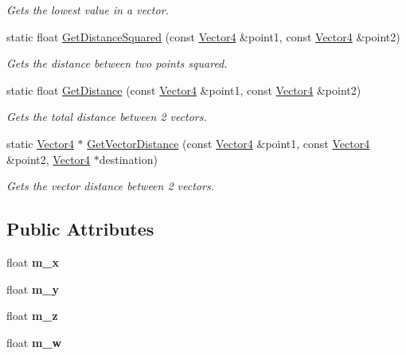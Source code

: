 \begin{DoxyCompactItemize}
\begin{DoxyCompactList}\small\item\em Gets the lowest value in a vector. \end{DoxyCompactList}\item 
static float \hyperlink{class_flounder_1_1_vector4_a02a94e3308ba3da5ff8b845d41b8131d}{Get\+Distance\+Squared} (const \hyperlink{class_flounder_1_1_vector4}{Vector4} \&point1, const \hyperlink{class_flounder_1_1_vector4}{Vector4} \&point2)
\begin{DoxyCompactList}\small\item\em Gets the distance between two points squared. \end{DoxyCompactList}\item 
static float \hyperlink{class_flounder_1_1_vector4_acf9a2b9a400177dc82a8f27ada32fecb}{Get\+Distance} (const \hyperlink{class_flounder_1_1_vector4}{Vector4} \&point1, const \hyperlink{class_flounder_1_1_vector4}{Vector4} \&point2)
\begin{DoxyCompactList}\small\item\em Gets the total distance between 2 vectors. \end{DoxyCompactList}\item 
static \hyperlink{class_flounder_1_1_vector4}{Vector4} $\ast$ \hyperlink{class_flounder_1_1_vector4_a8bfd658586cf78a702ecb99fcda3ad41}{Get\+Vector\+Distance} (const \hyperlink{class_flounder_1_1_vector4}{Vector4} \&point1, const \hyperlink{class_flounder_1_1_vector4}{Vector4} \&point2, \hyperlink{class_flounder_1_1_vector4}{Vector4} $\ast$destination)
\begin{DoxyCompactList}\small\item\em Gets the vector distance between 2 vectors. \end{DoxyCompactList}\end{DoxyCompactItemize}
\subsection*{Public Attributes}
\begin{DoxyCompactItemize}
\item 
\mbox{\label{class_flounder_1_1_vector4_a989dc12807ee230badeeade163e4f696}} 
float {\bfseries m\+\_\+x}
\item 
\mbox{\label{class_flounder_1_1_vector4_a2042f875140eaa0bc5b64ad3f8774492}} 
float {\bfseries m\+\_\+y}
\item 
\mbox{\label{class_flounder_1_1_vector4_a0782d609a0f41f439a260a67f15b5431}} 
float {\bfseries m\+\_\+z}
\item 
\mbox{\label{class_flounder_1_1_vector4_ab92e75ad2eb534a0ffe79b5ed45b74c8}} 
float {\bfseries m\+\_\+w}
\end{DoxyCompactItemize}


